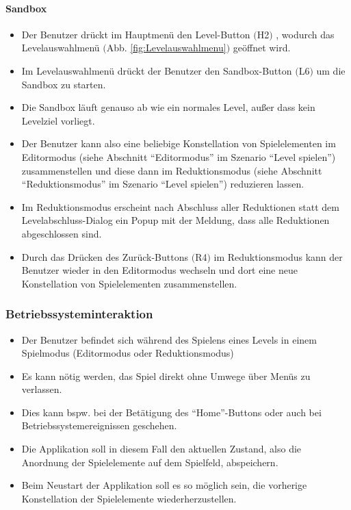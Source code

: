 \paragraph{Sandbox}
\begin{itemize}
	\item Der Benutzer drückt im Hauptmenü den Level-Button $($H2$)$ , wodurch das Levelauswahlmenü $($Abb. \ref{fig:Levelauswahlmenu}$)$ geöffnet wird.
	\item Im Levelauswahlmenü drückt der Benutzer den Sandbox-Button $($L6$)$ um die Sandbox zu starten.
	\item Die Sandbox läuft genauso ab wie ein normales Level, außer dass kein Levelziel vorliegt.
	\item Der Benutzer kann also eine beliebige Konstellation von Spielelementen im Editormodus (siehe Abschnitt "`Editormodus"' im Szenario "`Level spielen"') zusammenstellen und diese dann im Reduktionsmodus (siehe Abschnitt "`Reduktionsmodus"' im Szenario "`Level spielen"') reduzieren lassen.
	\item Im Reduktionsmodus erscheint nach Abschluss aller Reduktionen statt dem Levelabschluss-Dialog ein Popup mit der Meldung, dass alle Reduktionen abgeschlossen sind.
	\item Durch das Drücken des Zurück-Buttons $($R4$)$ im Reduktionsmodus kann der Benutzer wieder in den Editormodus wechseln und dort eine neue Konstellation von Spielelementen zusammenstellen.
\end{itemize}

\subsubsection{Betriebssysteminteraktion}
\begin{itemize}
	\item Der Benutzer befindet sich während des Spielens eines Levels in einem Spielmodus (Editormodus oder Reduktionsmodus) 
	\item Es kann nötig werden, das Spiel direkt ohne Umwege über Menüs zu verlassen.
	\item Dies kann bspw. bei der Betätigung des "`Home"'-Buttons  oder auch bei Betriebssystemereignissen geschehen.
	\item Die Applikation soll in diesem Fall den aktuellen Zustand, also die Anordnung der Spielelemente auf dem Spielfeld, abspeichern.
	\item Beim Neustart der Applikation soll es so möglich sein, die vorherige Konstellation der Spielelemente wiederherzustellen.
\end{itemize}

